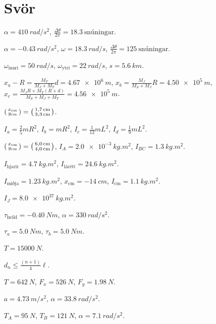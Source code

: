 \section*{Svör}

\begin{enumerate*}[label = \vspace{0.15cm} \textbf{(\arabic*)}]
  \item $\alpha = \SI{410}{rad/s^2}$, $\frac{\Delta \theta}{2\pi} = \SI{18.3}{\text{snúningar}}$.
  \item $\alpha = \SI{-0.43}{rad/s^2}$, $\omega = \SI{18.3}{rad/s}$, $\frac{\Delta \theta}{2\pi} = \SI{125}{\text{snúningar}}$.
  \item $\omega_{\text{innri}} = \SI{50}{rad/s}$, $\omega_{\text{ytri}} = \SI{22}{rad/s}$, $s = \SI{5.6}{km}$.
  \item $x_a - R = \frac{M_T}{M_J + M_T}d = \SI{4.67e6}{m}$, $x_b = \frac{M_J}{M_S + M_J}R = \SI{4.50e5}{m}$, $x_c = \frac{M_J R + M_T (R+d)}{M_S + M_J + M_T} = \SI{4.56e5}{m}$.
  \item $\smqty(x_{\text{cm}} \\ y_{\text{cm}}) = \smqty(\SI{1.7}{cm} \\ \SI{3.3}{cm})$. \item $I_a = \frac{2}{5}mR^2$, $I_b = mR^2$, $I_c = \frac{1}{12}mL^2$, $I_d = \frac{1}{9}mL^2$.
  \item $\smqty(x_{\text{cm}} \\ y_{\text{cm}}) = \smqty(\SI{6.0}{cm} \\ \SI{4.0}{cm})$, $I_A = \SI{2.0e-3}{kg.m^2}$, $I_{BC} = \SI{1.3}{kg.m^2}$.
  \item $I_{\text{hjarir}} = \SI{4.7}{kg.m^2}$, $I_{\text{lárétt}} = \SI{24.6}{kg.m^2}$.
  \item $I_{\text{miðja}} = \SI{1.23}{kg.m^2}$, $x_{\text{cm}} = \SI{-14}{cm}$, $I_{\text{cm}} = \SI{1.1}{kg.m^2}$.
  \item $I_J = \SI{8.0e37}{kg.m^2}$.
  \item $\tau_{\text{heild}} = \SI{-0.40}{Nm}$, $\alpha = \SI{330}{rad/s^2}$.
  \item $\tau_a = \SI{5.0}{Nm}$, $\tau_b = \SI{5.0}{Nm}$. \item $T = \SI{15000}{N}$. 
  \item $d_n \leq \frac{(n+1)}{4}\ell$.
  \item $T = \SI{642}{N}$, $F_x = \SI{526}{N}$, $F_y = \SI{1.98}{N}$.
  \item $a = \SI{4.73}{m/s^2}$, $\alpha = \SI{33.8}{rad/s^2}$.
  \item $T_A = \SI{95}{N}$, $T_B = \SI{121}{N}$, $\alpha = \SI{7.1}{rad/s^2}$.

\end{enumerate*}
